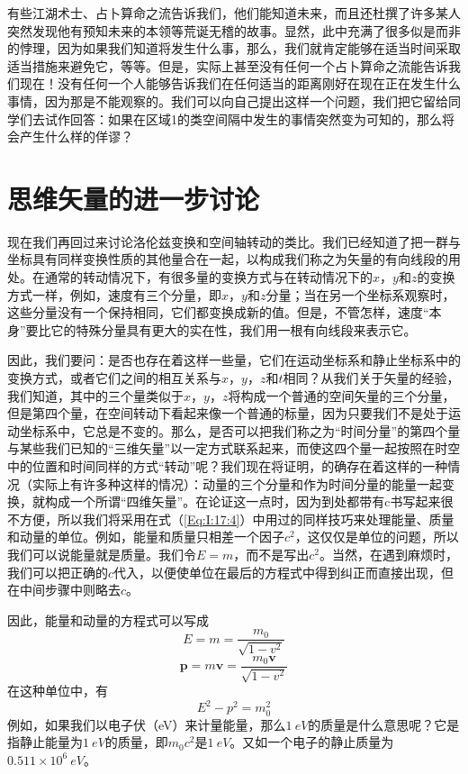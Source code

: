 有些江湖术士、占卜算命之流告诉我们，他们能知道未来，而且还杜撰了许多某人突然发现他有预知未来的本领等荒诞无稽的故事。显然，此中充满了很多似是而非的悖理，因为如果我们知道将发生什么事，那么，我们就肯定能够在适当时间采取适当措施来避免它，等等。但是，实际上甚至没有任何一个占卜算命之流能告诉我们现在！没有任何一个人能够告诉我们在任何适当的距离刚好在现在正在发生什么事情，因为那是不能观察的。我们可以向自己提出这样一个问题，我们把它留给同学们去试作回答：如果在区域1的类空间隔中发生的事情突然变为可知的，那么将会产生什么样的佯谬？

\section{思维矢量的进一步讨论}

现在我们再回过来讨论洛伦兹变换和空间轴转动的类比。我们已经知道了把一群与坐标具有同样变换性质的其他量合在一起，以构成我们称之为矢量的有向线段的用处。在通常的转动情况下，有很多量的变换方式与在转动情况下的$x$，$y$和$z$的变换方式一样，例如，速度有三个分量，即$x$，$y$和$z$分量；当在另一个坐标系观察时，这些分量没有一个保持相同，它们都变换成新的值。但是，不管怎样，速度“本身”要比它的特殊分量具有更大的实在性，我们用一根有向线段来表示它。

因此，我们要问：是否也存在着这样一些量，它们在运动坐标系和静止坐标系中的变换方式，或者它们之间的相互关系与$x$，$y$，$z$和$t$相同？从我们关于矢量的经验，我们知道，其中的三个量类似于$x$，$y$，$z$将构成一个普通的空间矢量的三个分量，但是第四个量，在空间转动下看起来像一个普通的标量，因为只要我们不是处于运动坐标系中，它总是不变的。那么，是否可以把我们称之为“时间分量”的第四个量与某些我们已知的“三维矢量”以一定方式联系起来，而使这四个量一起按照在时空中的位置和时间同样的方式“转动”呢？我们现在将证明，的确存在着这样的一种情况（实际上有许多种这样的情况）：动量的三个分量和作为时间分量的能量一起变换，就构成一个所谓“四维矢量”。在论证这一点时，因为到处都带有c书写起来很不方便，所以我们将采用在式（\ref{Eq:I:17:4}）中用过的同样技巧来处理能量、质量和动量的单位。例如，能量和质量只相差一个因子$c^2$，这仅仅是单位的问题，所以我们可以说能量就是质量。我们令$E=m$，而不是写出$c^2$。当然，在遇到麻烦时，我们可以把正确的$c$代入，以便使单位在最后的方程式中得到纠正而直接出现，但在中间步骤中则略去$c$。

因此，能量和动量的方程式可以写成
\begin{equation*}
    E=m=\frac{m_0}{\sqrt{1-v^2}}
\end{equation*}
\begin{equation}
    \label{Eq:I:17:6}
    \boldsymbol{p}=m\boldsymbol{v}=\frac{m_0\boldsymbol{v}}{\sqrt{1-v^2}}
\end{equation}
在这种单位中，有
\begin{equation}
    \label{Eq:I:17:7}
    E^2-p^2=m_0^2
\end{equation}
例如，如果我们以电子伏（eV）来计量能量，那么$1~eV$的质量是什么意思呢？它是指静止能量为$1~eV$的质量，即$m_0c^2$是$1~eV$。又如一个电子的静止质量为$0.511 \times 10^6~eV$。

